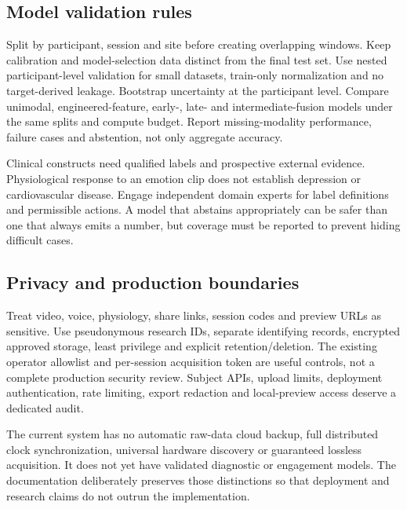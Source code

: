 \documentclass[11pt,a4paper]{article}
\begin{document}
\subsection{Model validation rules}
Split by participant, session and site before creating overlapping windows. Keep calibration and model-selection data distinct from the final test set. Use nested participant-level validation for small datasets, train-only normalization and no target-derived leakage. Bootstrap uncertainty at the participant level. Compare unimodal, engineered-feature, early-, late- and intermediate-fusion models under the same splits and compute budget. Report missing-modality performance, failure cases and abstention, not only aggregate accuracy.

Clinical constructs need qualified labels and prospective external evidence. Physiological response to an emotion clip does not establish depression or cardiovascular disease. Engage independent domain experts for label definitions and permissible actions. A model that abstains appropriately can be safer than one that always emits a number, but coverage must be reported to prevent hiding difficult cases.

\subsection{Privacy and production boundaries}
Treat video, voice, physiology, share links, session codes and preview URLs as sensitive. Use pseudonymous research IDs, separate identifying records, encrypted approved storage, least privilege and explicit retention/deletion. The existing operator allowlist and per-session acquisition token are useful controls, not a complete production security review. Subject APIs, upload limits, deployment authentication, rate limiting, export redaction and local-preview access deserve a dedicated audit.

The current system has no automatic raw-data cloud backup, full distributed clock synchronization, universal hardware discovery or guaranteed lossless acquisition. It does not yet have validated diagnostic or engagement models. The documentation deliberately preserves those distinctions so that deployment and research claims do not outrun the implementation.

\appendix
\end{document}

